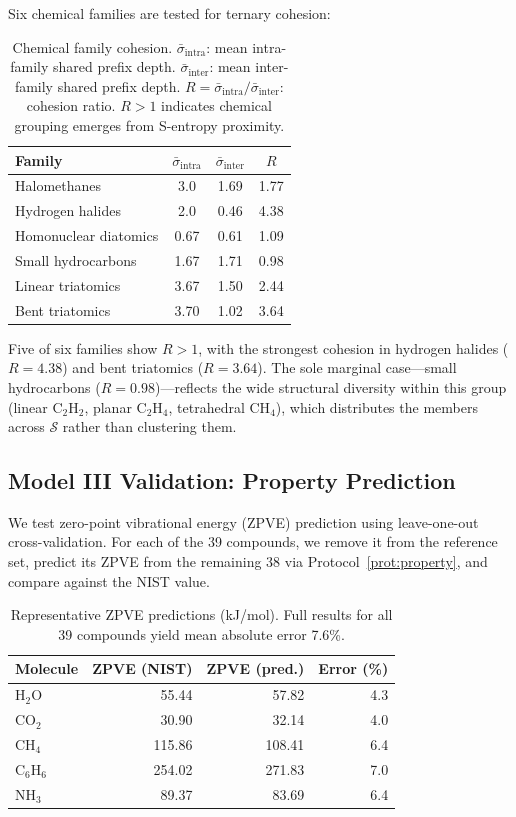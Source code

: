 \documentclass[11pt,twocolumn,a4paper]{article}
\theoremstyle{definition}
\theoremstyle{remark}
\newcommand{\Sspace}{\mathcal{S}}
\begin{document}
Six chemical families are tested for ternary cohesion:

\begin{table}[h]
\centering
\small
\begin{tabular}{lccc}
\toprule
\textbf{Family} & $\bar{\sigma}_{\mathrm{intra}}$ & $\bar{\sigma}_{\mathrm{inter}}$ & $R$ \\
\midrule
Halomethanes & 3.0 & 1.69 & 1.77 \\
Hydrogen halides & 2.0 & 0.46 & 4.38 \\
Homonuclear diatomics & 0.67 & 0.61 & 1.09 \\
Small hydrocarbons & 1.67 & 1.71 & 0.98 \\
Linear triatomics & 3.67 & 1.50 & 2.44 \\
Bent triatomics & 3.70 & 1.02 & 3.64 \\
\bottomrule
\end{tabular}
\caption{Chemical family cohesion. $\bar{\sigma}_{\mathrm{intra}}$: mean intra-family shared prefix depth. $\bar{\sigma}_{\mathrm{inter}}$: mean inter-family shared prefix depth. $R = \bar{\sigma}_{\mathrm{intra}}/\bar{\sigma}_{\mathrm{inter}}$: cohesion ratio. $R > 1$ indicates chemical grouping emerges from S-entropy proximity.}
\label{tab:cohesion}
\end{table}

Five of six families show $R > 1$, with the strongest cohesion in hydrogen halides ($R = 4.38$) and bent triatomics ($R = 3.64$). The sole marginal case---small hydrocarbons ($R = 0.98$)---reflects the wide structural diversity within this group (linear C$_2$H$_2$, planar C$_2$H$_4$, tetrahedral CH$_4$), which distributes the members across $\Sspace$ rather than clustering them.

\subsection{Model III Validation: Property Prediction}

We test zero-point vibrational energy (ZPVE) prediction using leave-one-out cross-validation. For each of the 39 compounds, we remove it from the reference set, predict its ZPVE from the remaining 38 via Protocol~\ref{prot:property}, and compare against the NIST value.

\begin{table}[h]
\centering
\small
\begin{tabular}{lrrr}
\toprule
\textbf{Molecule} & \textbf{ZPVE (NIST)} & \textbf{ZPVE (pred.)} & \textbf{Error (\%)} \\
\midrule
H$_2$O & 55.44 & 57.82 & 4.3 \\
CO$_2$ & 30.90 & 32.14 & 4.0 \\
CH$_4$ & 115.86 & 108.41 & 6.4 \\
C$_6$H$_6$ & 254.02 & 271.83 & 7.0 \\
NH$_3$ & 89.37 & 83.69 & 6.4 \\
\bottomrule
\end{tabular}
\caption{Representative ZPVE predictions (kJ/mol). Full results for all 39 compounds yield mean absolute error 7.6\%.}
\label{tab:zpve}
\end{table}
\end{document}

